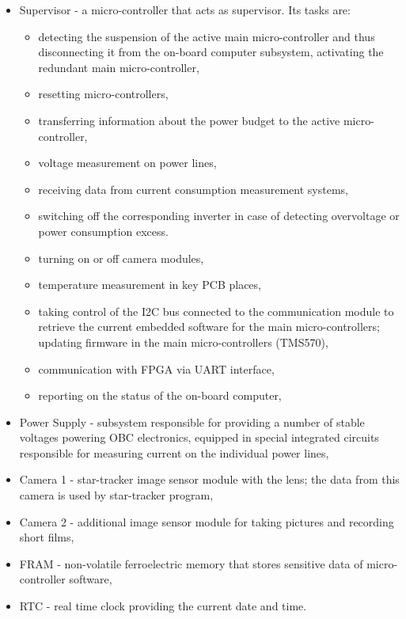 \documentclass[12pt,a4paper,oneside]{article}
\begin{document}
\begin{itemize}
\item Supervisor - a micro-controller that acts as supervisor. Its tasks are:
\begin{itemize}
\item detecting the suspension of the active main micro-controller and thus disconnecting it from the on-board computer subsystem, activating the redundant main micro-controller,
\item resetting micro-controllers,
\item transferring information about the power budget to the active micro-controller,
\item voltage measurement on power lines,
\item receiving data from current consumption measurement systems,
\item switching off the corresponding inverter in case of detecting overvoltage or power consumption excess.
\item turning on or off camera modules,
\item temperature measurement in key PCB places,
\item taking control of the I2C bus connected to the communication module to retrieve the current embedded software for the main micro-controllers; updating firmware in the main micro-controllers (TMS570),
\item communication with FPGA via UART interface,
\item reporting on the status of the on-board computer,
\end{itemize}

\item Power Supply - subsystem responsible for providing a number of stable voltages powering OBC electronics, equipped in special integrated circuits responsible for measuring current on the individual power lines,

\item Camera 1 - star-tracker image sensor module with the lens; the data from this camera is used by star-tracker program,

\item Camera 2 - additional image sensor module for taking pictures and recording short films,

\item FRAM - non-volatile ferroelectric memory that stores sensitive data of micro-controller software,

\item RTC - real time clock providing the current date and time.

\end{itemize}
\end{document}
